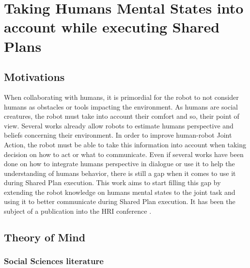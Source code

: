 \documentclass[english,a4paper,11pt,twoside]{StyleThese}
\begin{document}
\setcounter{chapter}{2} %
\dominitoc
\faketableofcontents
\fi

\chapter{Taking Humans Mental States into account while executing Shared Plans}
\minitoc

\label{ch:MS}

\section{Motivations}

When collaborating with humans, it is primordial for the robot to not consider humans as obstacles or tools impacting the environment. As humans are social creatures, the robot must take into account their comfort and so, their point of view. Several works already allow robots to estimate humans perspective and beliefs concerning their environment. In order to improve human-robot Joint Action, the robot must be able to take this information into account when taking decision on how to act or what to communicate. Even if several works have been done on how to integrate humans perspective in dialogue or use it to help the understanding of humans behavior, there is still a gap when it comes to use it during Shared Plan execution. This work aims to start filling this gap by extending the robot knowledge on humans mental states to the joint task and using it to better communicate during Shared Plan execution. It has been the subject of a publication into the HRI conference \cite{devin2016implemented}.

\section{Theory of Mind}

\subsection{Social Sciences literature}
\end{document}
